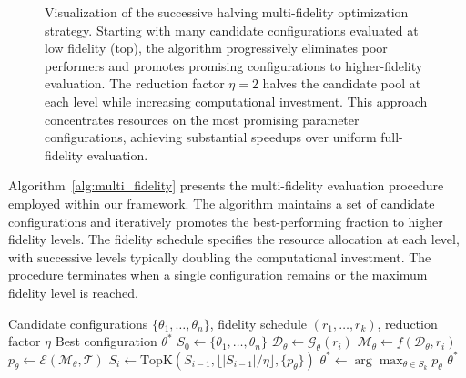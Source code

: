 \begin{figure}[t]
\centering
\resizebox{\textwidth}{!}{}
\caption{Visualization of the successive halving multi-fidelity optimization strategy. Starting with many candidate configurations evaluated at low fidelity (top), the algorithm progressively eliminates poor performers and promotes promising configurations to higher-fidelity evaluation. The reduction factor $\eta=2$ halves the candidate pool at each level while increasing computational investment. This approach concentrates resources on the most promising parameter configurations, achieving substantial speedups over uniform full-fidelity evaluation.}
\label{fig:multifidelity}
\end{figure}

Algorithm~\ref{alg:multi_fidelity} presents the multi-fidelity evaluation procedure employed within our framework. The algorithm maintains a set of candidate configurations and iteratively promotes the best-performing fraction to higher fidelity levels. The fidelity schedule specifies the resource allocation at each level, with successive levels typically doubling the computational investment. The procedure terminates when a single configuration remains or the maximum fidelity level is reached.

\begin{algorithm}[t]
\caption{Multi-Fidelity Successive Halving for Synthetic Data Optimization}
\label{alg:multi_fidelity}
\begin{algorithmic}[1]
\Require Candidate configurations $\{\theta_1, \ldots, \theta_n\}$, fidelity schedule $(r_1, \ldots, r_k)$, reduction factor $\eta$
\Ensure Best configuration $\theta^*$
\State $S_0 \gets \{\theta_1, \ldots, \theta_n\}$ 
        \State $\mathcal{D}_\theta \gets \mathcal{G}_\theta(r_i)$ 
        \State $\mathcal{M}_\theta \gets f(\mathcal{D}_\theta, r_i)$ 
        \State $p_\theta \gets \mathcal{E}(\mathcal{M}_\theta, \mathcal{T})$ 
    \EndFor
    \State $S_i \gets \text{TopK}(S_{i-1}, \lfloor |S_{i-1}| / \eta \rfloor, \{p_\theta\})$ 
\EndFor
\State $\theta^* \gets \arg\max_{\theta \in S_k} p_\theta$
\State \Return $\theta^*$
\end{algorithmic}
\end{algorithm}

